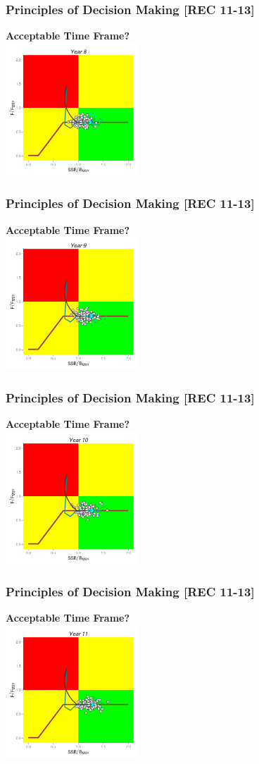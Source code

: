 \begin{frame}\frametitle{Principles of Decision Making [REC 11-13]} \smallskip\textbf{Acceptable Time Frame?}\smallskip\\ \includegraphics[height=50mm,width=50mm]{hcrII9.png}\end{frame}
\begin{frame}\frametitle{Principles of Decision Making [REC 11-13]} \smallskip\textbf{Acceptable Time Frame?}\smallskip\\ \includegraphics[height=50mm,width=50mm]{hcrII10.png}\end{frame}
\begin{frame}\frametitle{Principles of Decision Making [REC 11-13]} \smallskip\textbf{Acceptable Time Frame?}\smallskip\\ \includegraphics[height=50mm,width=50mm]{hcrII11.png}\end{frame}
\begin{frame}\frametitle{Principles of Decision Making [REC 11-13]} \smallskip\textbf{Acceptable Time Frame?}\smallskip\\ \includegraphics[height=50mm,width=50mm]{hcrII12.png}\end{frame}

